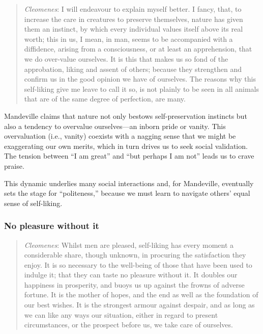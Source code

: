             \begin{quote}
                \textit{Cleomenes}: I will endeavour to explain myself better. I fancy, that, to increase the care in creatures to preserve themselves, nature has given them an instinct, by which every individual values itself above its real worth; this in us, I mean, in man, seems to be accompanied with a diffidence, arising from a consciousness, or at least an apprehension, that we do over-value ourselves. It is this that makes us so fond of the approbation, liking and assent of others; because they strengthen and confirm us in the good opinion we have of ourselves. The reasons why this self-liking give me leave to call it so, is not plainly to be seen in all animals that are of the same degree of perfection, are many.
            \end{quote}

            Mandeville claims that nature not only bestows self-preservation instincts but also a tendency to overvalue ourselves—an inborn pride or vanity. This overvaluation (i.e., vanity) coexists with a nagging sense that we might be exaggerating our own merits, which in turn drives us to seek social validation. The tension between “I am great” and “but perhaps I am not” leads us to crave praise.
            
            This dynamic underlies many social interactions and, for Mandeville, eventually sets the stage for “politeness,” because we must learn to navigate others’ equal sense of self-liking.

        \subsubsection{No pleasure without it}

            \begin{quote}
                \textit{Cleomenes}: Whilst men are pleased, self-liking has every moment a considerable share, though unknown, in procuring the satisfaction they enjoy. It is so necessary to the well-being of those that have been used to indulge it; that they can taste no pleasure without it. It doubles our happiness in prosperity, and buoys us up against the frowns of adverse fortune. It is the mother of hopes, and the end as well as the foundation of our best wishes. It is the strongest armour against despair, and as long as we can like any ways our situation, either in regard to present circumstances, or the prospect before us, we take care of ourselves.
            \end{quote}

